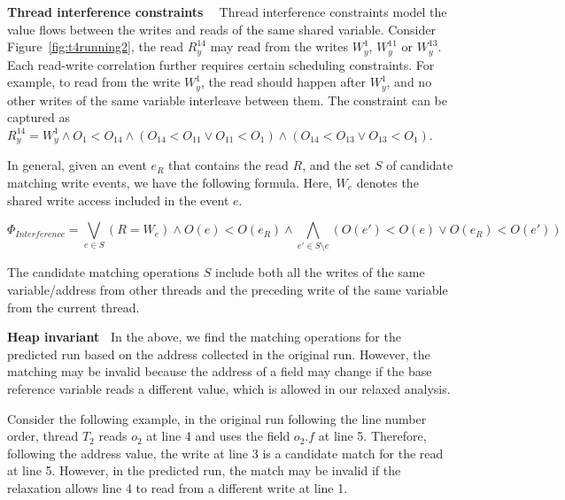{\bf Thread interference constraints \ }  Thread interference constraints model the value flows between the writes and reads of the same shared variable. 
Consider Figure~\ref{fig:t4running2},  the read $R^{14}_y$ may read from the writes $W^1_y$, $W^{11}_y$ or $W^{13}_y$.
Each read-write correlation further requires certain scheduling constraints. For example, to read from the write $W^1_y$, the read should happen after $W^1_y$, and no other writes of the same variable interleave between them. The constraint can be captured as $R^{14}_y=W^1_y \wedge O_1<O_{14} \wedge (O_{14}<O_{11} \vee O_{11} < O_1) \wedge (O_{14}<O_{13} \vee O_{13}<O_{1})$.  

In general,  given an event $e_R$ that contains the read $R$, and the set $S$ of candidate matching write events, we have the following formula. Here, $W_e$ denotes the shared write access included in the event $e$. 


$$
\Phi_{Interference}= \bigvee_{e\in S} (R=W_e) \wedge O(e)<O(e_R)
\wedge \bigwedge_{e'\in S\setminus e} (O(e')<O(e) \vee O(e_R)<O(e'))
$$


The candidate matching operations $S$ include both all the writes of the same variable/address from other threads and the preceding write of the same variable from the current thread. 


{\bf Heap invariant\ } In the above, we find the matching operations for the predicted run based on the address collected in the original run.
However, the matching may be invalid because the address of a field may change if the base reference variable reads a different value, which is allowed in our relaxed analysis. 

Consider the following example, in the original run following the line number order, thread $T_2$ reads $o_2$ at line 4 and uses the field $o_2.f$ at line 5. 
Therefore, following the address value, the write at line 3 is a candidate match for the read at line 5. However, in the predicted run, the match may be invalid if the relaxation allows line 4 to read from a different write at line 1.


